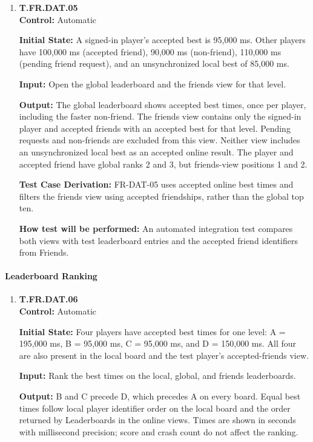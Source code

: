 \documentclass[12pt, titlepage]{article}
\begin{document}
{\begin{enumerate}
\item{\hypertarget{test-fr-da05}{}\textbf{T.FR.DAT.05}\\}
\textbf{Control:} Automatic

\textbf{Initial State:} A signed-in player's accepted best is 95,000 ms. Other
players have 100,000 ms (accepted friend), 90,000 ms (non-friend), 110,000 ms
(pending friend request), and an unsynchronized local best of 85,000 ms.

\textbf{Input:} Open the global leaderboard and the friends view for that level.

\textbf{Output:} The global leaderboard shows accepted best times, once per player,
including the faster non-friend. The friends view contains only the signed-in player
and accepted friends with an accepted best for that level. Pending requests and
non-friends are excluded from this view. Neither view includes an unsynchronized
local best as an accepted online result. The player and accepted friend have global
ranks 2 and 3, but friends-view positions 1 and 2.

\textbf{Test Case Derivation:} \mbox{FR-DAT-05} uses accepted online best times and
filters the friends view using accepted friendships, rather than the global top ten.

\textbf{How test will be performed:} An automated integration test compares both
views with test leaderboard entries and the accepted friend identifiers from Friends.

\end{enumerate}

\paragraph{Leaderboard Ranking}

\begin{enumerate}

\item{\hypertarget{test-fr-da06}{}\textbf{T.FR.DAT.06}\\}
\textbf{Control:} Automatic

\textbf{Initial State:} Four players have accepted best times for one level:
A = 195,000 ms, B = 95,000 ms, C = 95,000 ms, and D = 150,000 ms. All four
are also present in the local board and the test player's accepted-friends view.

\textbf{Input:} Rank the best times on the local, global, and friends leaderboards.

\textbf{Output:} B and C precede D, which precedes A on every board. Equal best
times follow local player identifier order on the local board and the order returned
by Leaderboards in the online views. Times are shown in seconds with millisecond
precision; score and crash count do not affect the ranking.


\end{enumerate}}
\end{document}
